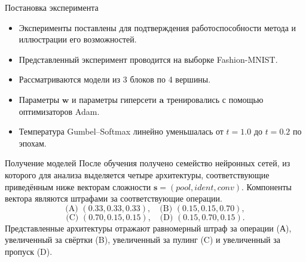 \documentclass{beamer}
\begin{document}

\begin{frame}{Постановка эксперимента}
\begin{itemize}
    \item Эксперименты поставлены для подтверждения работоспособности метода и иллюстрации его возможностей.
    \vspace{10pt}
    \item Представленный эксперимент проводится на выборке Fashion-MNIST.
    \vspace{10pt}
    \item Рассматриваются модели из 3 блоков по 4 вершины.
    \vspace{10pt}
    \item Параметры $\boldsymbol w$ и параметры гиперсети $\boldsymbol a$ тренировались с помощью оптимизаторов Adam. 
    \vspace{10pt}
    \item Температура Gumbel–Softmax линейно уменьшалась от \(t{=}1.0\) до \(t{=}0.2\) по эпохам. 

\end{itemize}
\end{frame}

\begin{frame}{Получение моделей}
После обучения получено семейство нейронных сетей, из которого для анализа выделяется четыре архитектуры, соответствующие приведённым ниже векторам сложности $\boldsymbol{s} = (pool, ident, conv)$. Компоненты вектора  являются штрафами за соответствующие операции.
\[
\text{(A) } (0.33,0.33,0.33),\quad
\text{(B) } (0.15,0.15,0.70),
\]
\[
\text{(C) } (0.70,0.15,0.15),\quad
\text{(D) } (0.15,0.70,0.15).
\]
Представленные архитектуры отражают равномерный штраф за операции (А), увеличенный за свёртки (B), увеличенный за пулинг (C) и увеличенный за пропуск (D). 


\end{frame}
\end{document}
